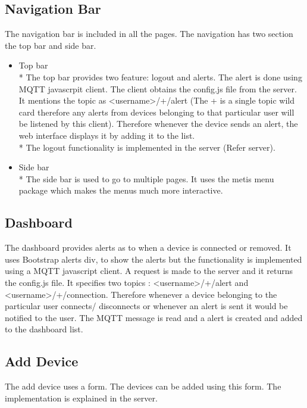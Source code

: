 \documentclass{report}
\begin{document}
\subsection{Navigation Bar}
The navigation bar is included in all the pages. The navigation has two section the top bar and side bar.
\begin{itemize}
    \item Top bar\\*
    The top bar provides two feature: logout and alerts. The alert is done using MQTT javascrpit client. The client obtains the config.js file from the server. It mentions the topic as <username>/+/alert (The + is a single topic wild card therefore any alerts from devices belonging to that particular user will be listened by this client). Therefore whenever the device sends an alert, the web interface displays it by adding it to the list.\\*
    The logout functionality is implemented in the server (Refer server).
    \item Side bar\\*
    The side bar is used to go to multiple pages. It uses the metis menu package which makes the menus much more interactive.
\end{itemize}

\subsection{Dashboard}
The dashboard provides alerts as to when a device is connected or removed. It uses Bootstrap alerts div, to show the alerts but the functionality is implemented using a MQTT javascript client. A request is made to the server and it returns the config.js file. It specifies two topics : <username>/+/alert and <username>/+/connection. Therefore whenever a device belonging to the particular user connects/ disconnects or whenever an alert is sent it would be notified to the user. The MQTT message is read and a alert is created and added to the dashboard list.

\subsection{Add Device}
The add device uses a form. The devices can be added using this form. The implementation is explained in the server.
\end{document}
